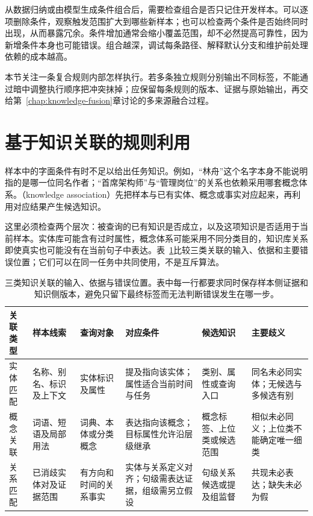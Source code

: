 从数据归纳或由模型生成条件组合后，需要检查组合是否只记住开发样本。可以逐项删除条件，观察触发范围扩大到哪些新样本；也可以检查两个条件是否始终同时出现，从而暴露冗余。条件增加通常会缩小覆盖范围，却不必然提高可靠性，因为新增条件本身也可能错误。组合越深，调试每条路径、解释默认分支和维护前处理依赖的成本越高。

本节关注一条复合规则内部怎样执行。若多条独立规则分别输出不同标签，不能通过暗中调整执行顺序把冲突抹掉；应保留每条规则的版本、证据与原始输出，再交给第~\ref{chap:knowledge-fusion}章讨论的多来源融合过程。

\section{基于知识关联的规则利用}
\label{sec:rule-based-knowledge-acquisition-association}

样本中的字面条件有时不足以给出任务知识。例如，“林舟”这个名字本身不能说明指的是哪一位同名作者；“首席架构师”与“管理岗位”的关系也依赖采用哪套概念体系。（knowledge association）先把样本与已有实体、概念或事实对应起来，再利用对应结果产生候选知识。

这里必须检查两个层次：被查询的已有知识是否成立，以及这项知识是否适用于当前样本。实体库可能含有过时属性，概念体系可能采用不同分类目的，知识库关系即使真实也可能没有在当前句子中表达。表~\ref{tab:rule-based-knowledge-acquisition-association}比较三类关联的输入、依据和主要错误位置；它们可以在同一任务中共同使用，不是互斥算法。

\begin{table}[htbp]
  \centering
  \begingroup
  \setlength{\tabcolsep}{2.5pt}
  \setlength{\parindent}{0pt}
  \setlength{\RaggedRightParindent}{0pt}
  \renewcommand{\arraystretch}{1.12}
  \begin{tabularx}{\linewidth}{>{\raggedright\arraybackslash}p{17mm}>{\raggedright\arraybackslash}p{25mm}>{\raggedright\arraybackslash}p{26mm}>{\raggedright\arraybackslash}p{30mm}>{\raggedright\arraybackslash}p{29mm}>{\raggedright\arraybackslash}X}
    \toprule
    关联类型 & 样本线索 & 查询对象 & 对应条件 & 候选知识 & 主要歧义 \\
    \midrule
    实体匹配 & 名称、别名、标识及上下文 & 实体标识及属性 & 提及指向该实体；属性适合当前时间与任务 & 类别、属性或查询入口 & 同名未必同实体；无候选与多候选有别 \\
    概念关联 & 词语、短语及局部用法 & 词典、本体或分类概念 & 表达指向该概念；目标属性允许沿层级继承 & 概念标签、上位类或候选范围 & 相似未必同义；上位类不能确定唯一细类 \\
    关系匹配 & 已消歧实体对及证据范围 & 有方向和时间的关系事实 & 实体与关系定义对齐；句级需表达证据，组级需另立假设 & 句级关系候选或提及组监督 & 共现未必表达；缺失未必为假 \\
    \bottomrule
  \end{tabularx}
  \endgroup
  \caption{三类知识关联的输入、依据与错误位置。表中每一行都要求同时保存样本侧证据和知识侧版本，避免只留下最终标签而无法判断错误发生在哪一步。}
  \label{tab:rule-based-knowledge-acquisition-association}
\end{table}

